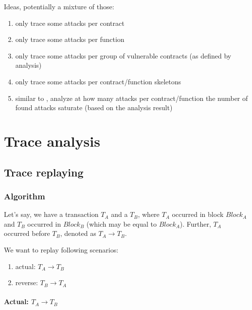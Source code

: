\documentclass[draft,final]{vutinfth} %
\begin{document}
    Ideas, potentially a mixture of those:

    \begin{enumerate}
        \item only trace some attacks per contract
        \item only trace some attacks per function
        \item only trace some attacks per group of vulnerable contracts (as defined by analysis)
        \item only trace some attacks per contract/function skeletons
        \item similar to \cite{}, analyze at how many attacks per contract/function the number of found attacks saturate (based on the analysis result)
    \end{enumerate}
\fi

\chapter{Trace analysis}
\iffalse

    \section{Trace replaying}

    \subsection{Algorithm}

    Let's say, we have a transaction $T_A$ and a $T_B$, where $T_A$ occurred in block $Block_A$ and $T_B$ occurred in $Block_B$ (which may be equal to $Block_A$). Further, $T_A$ occurred before $T_B$, denoted as $T_A \rightarrow T_B$.

    We want to replay following scenarios:

    \begin{enumerate}
        \item actual: $T_A \rightarrow T_B$
        \item reverse: $T_B \rightarrow T_A$
    \end{enumerate}

    \subsubsection{Actual: $T_A \rightarrow T_B$}
\end{document}
